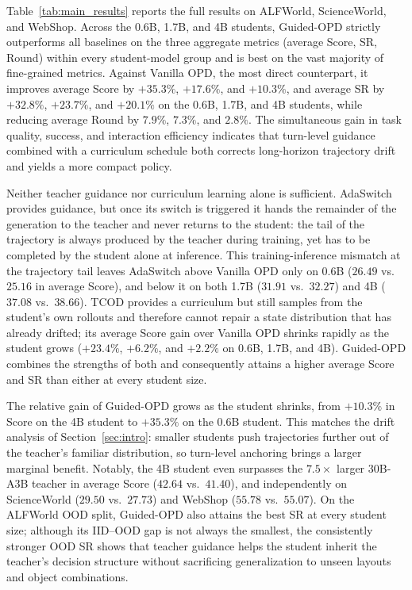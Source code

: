 \documentclass[11pt]{article}
\begin{document}
Table~\ref{tab:main_results} reports the full results on ALFWorld, ScienceWorld, and WebShop. Across the 0.6B, 1.7B, and 4B students, Guided-OPD strictly outperforms all baselines on the three aggregate metrics (average Score, SR, Round) within every student-model group and is best on the vast majority of fine-grained metrics. Against Vanilla OPD, the most direct counterpart, it improves average Score by $+35.3\%$, $+17.6\%$, and $+10.3\%$, and average SR by $+32.8\%$, $+23.7\%$, and $+20.1\%$ on the 0.6B, 1.7B, and 4B students, while reducing average Round by $7.9\%$, $7.3\%$, and $2.8\%$. The simultaneous gain in task quality, success, and interaction efficiency indicates that turn-level guidance combined with a curriculum schedule both corrects long-horizon trajectory drift and yields a more compact policy.

Neither teacher guidance nor curriculum learning alone is sufficient. AdaSwitch provides guidance, but once its switch is triggered it hands the remainder of the generation to the teacher and never returns to the student: the tail of the trajectory is always produced by the teacher during training, yet has to be completed by the student alone at inference. This training-inference mismatch at the trajectory tail leaves AdaSwitch above Vanilla OPD only on 0.6B ($26.49$ vs.\ $25.16$ in average Score), and below it on both 1.7B ($31.91$ vs.\ $32.27$) and 4B ($37.08$ vs.\ $38.66$). 
TCOD provides a curriculum but still samples from the student's own rollouts and therefore cannot repair a state distribution that has already drifted; its average Score gain over Vanilla OPD shrinks rapidly as the student grows ($+23.4\%$, $+6.2\%$, and $+2.2\%$ on 0.6B, 1.7B, and 4B). Guided-OPD combines the strengths of both and consequently attains a higher average Score and SR than either at every student size.

The relative gain of Guided-OPD grows as the student shrinks, from $+10.3\%$ in Score on the 4B student to $+35.3\%$ on the 0.6B student. This matches the drift analysis of Section~\ref{sec:intro}: smaller students push trajectories further out of the teacher's familiar distribution, so turn-level anchoring brings a larger marginal benefit. Notably, the 4B student even surpasses the $7.5\times$ larger 30B-A3B teacher in average Score ($42.64$ vs.\ $41.40$), and independently on ScienceWorld ($29.50$ vs.\ $27.73$) and WebShop ($55.78$ vs.\ $55.07$). On the ALFWorld OOD split, Guided-OPD also attains the best SR at every student size; although its IID--OOD gap is not always the smallest, the consistently stronger OOD SR shows that teacher guidance helps the student inherit the teacher's decision structure without sacrificing generalization to unseen layouts and object combinations.
\end{document}
